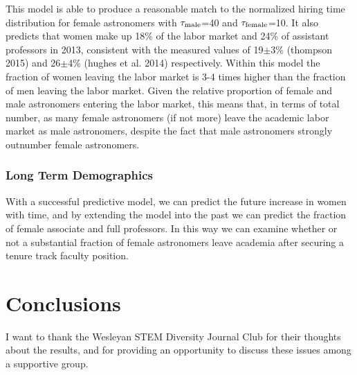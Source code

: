 \documentclass[modern]{aastex62}
\begin{document}
This model is able to produce a reasonable match to the normalized hiring time distribution for female astronomers with $\tau_{\rm male}$=40 and $\tau_{\rm female}$=10. It also predicts that women make up 18\% of the labor market and 24\% of assistant professors in 2013, consistent with the measured values of 19$\pm$3\% (thompson 2015) and 26$\pm$4\% (hughes et al. 2014) respectively. Within this model the fraction of women leaving the labor market is 3-4 times higher than the fraction of men leaving the labor market. Given the relative proportion of female and male astronomers entering the labor market, this means that, in terms of total number, as many female astronomers (if not more) leave the academic labor market as male astronomers, despite the fact that male astronomers strongly outnumber female astronomers. 

\subsubsection{Long Term Demographics}
With a successful predictive model, we can predict the future increase in women with time, and by extending the model into the past we can predict the fraction of female associate and full professors. In this way we can examine whether or not a substantial fraction of female astronomers leave academia after securing a tenure track faculty position. 

\section{Conclusions}

\acknowledgements
I want to thank the Wesleyan STEM Diversity Journal Club for their thoughts about the results, and for providing an opportunity to discuss these issues among a supportive group.

\begin{thebibliography}{}

\end{thebibliography}
\end{document}
